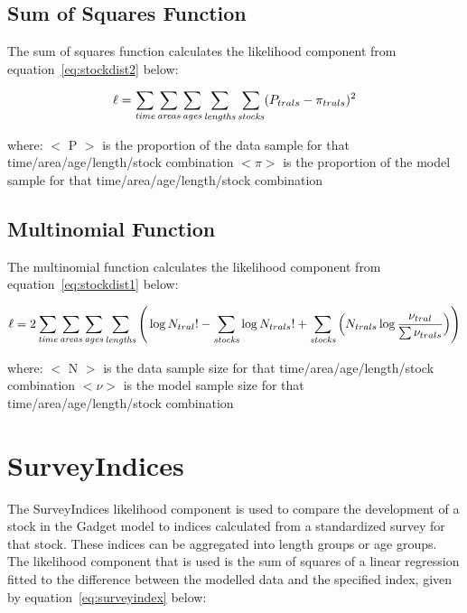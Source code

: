 \documentclass[10pt,twoside]{book}
\begin{document}
\subsection{Sum of Squares Function}
The sum of squares function calculates the likelihood component from equation~\ref{eq:stockdist2} below:

\begin{equation}\label{eq:stockdist2}
\ell = \sum_{\it time}\sum_{\it areas}\sum_{\it ages}\sum_{\it lengths}\sum_{\it stocks} ( P_{trals} - \pi_{trals} ) ^2
\end{equation}

where:\newline
$<$ P $>$ is the proportion of the data sample for that time/area/age/length/stock combination\newline
$<\pi>$ is the proportion of the model sample for that time/area/age/length/stock combination

\subsection{Multinomial Function}
The multinomial function calculates the likelihood component from equation~\ref{eq:stockdist1} below:

\begin{equation}\label{eq:stockdist1}
\ell = 2 \sum_{\it time}\sum_{\it areas}\sum_{\it ages}\sum_{\it lengths} \Bigg( \log N_{tral}! - \sum_{\it stocks} \log N_{trals}! + \sum_{\it stocks} \Big( N_{trals} \log {\frac{\nu_{tral}}{\sum \nu_{trals}}} \Big)\Bigg)
\end{equation}

where:\newline
$<$ N $>$ is the data sample size for that time/area/age/length/stock combination\newline
$<\nu>$ is the model sample size for that time/area/age/length/stock combination

\section{SurveyIndices}\label{sec:surveyindices}
The SurveyIndices likelihood component is used to compare the development of a stock in the Gadget model to indices calculated from a standardized survey for that stock.  These indices can be aggregated into length groups or age groups.  The likelihood component that is used is the sum of squares of a linear regression fitted to the difference between the modelled data and the specified index, given by equation~\ref{eq:surveyindex} below:
\end{document}
